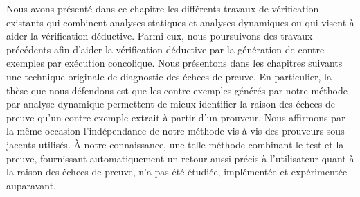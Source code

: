 Nous avons présenté dans ce chapitre les différents travaux de vérification
existants qui combinent analyses statiques et analyses dynamiques ou qui visent
à aider la vérification déductive.
Parmi eux, nous poursuivons des travaux précédents afin d'aider la vérification
déductive par la génération de contre-exemples par exécution concolique.
Nous présentons dans les chapitres suivants une technique originale de
diagnostic des échecs de preuve.
En particulier, la thèse que nous défendons est que les contre-exemples générés
par notre méthode par analyse dynamique permettent de mieux identifier la raison
des échecs de preuve qu'un contre-exemple extrait à partir d'un prouveur.
Nous affirmons par la même occasion l'indépendance de notre méthode vis-à-vis
des prouveurs sous-jacents utilisés.
À notre connaissance, une telle méthode combinant le test et la preuve,
fournissant automatiquement un retour aussi précis à l'utilisateur quant à la
raison des échecs de preuve, n'a pas été étudiée, implémentée et expérimentée
auparavant.
